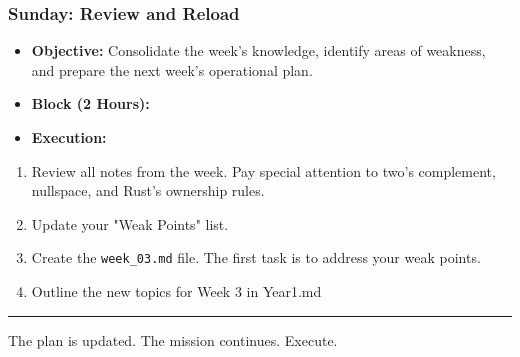 \subsubsection{\textbf{Sunday: Review and Reload}}
\begin{itemize}
  \item \textbf{Objective:} Consolidate the week's knowledge, identify areas of weakness, and prepare the next week's operational plan.
  \item \textbf{Block (2 Hours):}
  \item \textbf{Execution:}
\end{itemize}
\begin{enumerate}
  \item Review all notes from the week. Pay special attention to two's complement, nullspace, and Rust's ownership rules.
  \item Update your "Weak Points" list.
  \item Create the \texttt{week\_03.md} file. The first task is to address your weak points.
  \item Outline the new topics for Week 3 in Year1.md

\end{enumerate}
\noindent\rule{\textwidth}{0.4pt}

The plan is updated. The mission continues. Execute.
